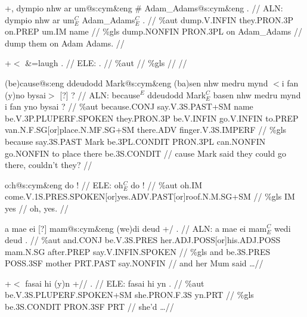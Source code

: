 \documentclass[a4paper,10pt]{article}
\begin{document}
\ex
\begingl[lingstyle=gergl]
\glchat +, dympio nhw ar um@s:cym\&eng \# Adam\_Adams@s:cym\&eng . //
\glsurface ALN:  dympio nhw ar um$^{C}_{E}$ Adam\_Adams$^{C}_{E}$ .  //
\glauto \%aut  dump{\scriptsize .V.INFIN} they{\scriptsize .PRON.3P} on{\scriptsize .PREP} um{\scriptsize .IM} name   //
\glmanual \%gls  dump{\scriptsize .NONFIN} PRON{\scriptsize .3PL} on Adam\_Adams    //
\gleng dump them on Adam Adams. //
\endgl
\xe

\ex
\begingl[lingstyle=gergl]
\glchat +$<$ \&=laugh . //
\glsurface ELE:  .  //
\glauto \%aut    //
\glmanual \%gls    //
\gleng  //
\endgl
\xe

\ex
\begingl[lingstyle=gergl]
\glchat (be)cause@s:eng ddeudodd Mark@s:cym\&eng (ba)sen nhw medru mynd $<$i fan (y)no bysai$>$ [?] ? //
\glsurface ALN:  because$^{E}$ ddeudodd Mark$^{C}_{E}$ basen nhw medru mynd i fan yno bysai ?  //
\glauto \%aut  because{\scriptsize .CONJ} say{\scriptsize .V.3S.PAST+SM} name be{\scriptsize .V.3P.PLUPERF.SPOKEN} they{\scriptsize .PRON.3P} be{\scriptsize .V.INFIN} go{\scriptsize .V.INFIN} to{\scriptsize .PREP} van{\scriptsize .N.F.SG[or]place.N.MF.SG+SM} there{\scriptsize .ADV} finger{\scriptsize .V.3S.IMPERF}   //
\glmanual \%gls  because say{\scriptsize .3S.PAST} Mark be{\scriptsize .3PL.CONDIT} PRON{\scriptsize .3PL} can{\scriptsize .NONFIN} go{\scriptsize .NONFIN} to place there be{\scriptsize .3S.CONDIT}   //
\gleng cause Mark said they could go there, couldn't they? //
\endgl
\xe

\ex
\begingl[lingstyle=gergl]
\glchat o:h@s:cym\&eng do ! //
\glsurface ELE:  oh$^{C}_{E}$ do !  //
\glauto \%aut  oh{\scriptsize .IM} come{\scriptsize .V.1S.PRES.SPOKEN[or]yes.ADV.PAST[or]roof.N.M.SG+SM}   //
\glmanual \%gls  IM yes   //
\gleng oh, yes. //
\endgl
\xe

\ex
\begingl[lingstyle=gergl]
\glchat a mae ei [?] mam@s:cym\&eng (we)di deud +/ . //
\glsurface ALN:  a mae ei mam$^{C}_{E}$ wedi deud .  //
\glauto \%aut  and{\scriptsize .CONJ} be{\scriptsize .V.3S.PRES} her{\scriptsize .ADJ.POSS[or]his.ADJ.POSS} mam{\scriptsize .N.SG} after{\scriptsize .PREP} say{\scriptsize .V.INFIN.SPOKEN}   //
\glmanual \%gls  and be{\scriptsize .3S.PRES} POSS{\scriptsize .3SF} mother PRT{\scriptsize .PAST} say{\scriptsize .NONFIN}   //
\gleng and her Mum said \dots  //
\endgl
\xe

\ex
\begingl[lingstyle=gergl]
\glchat +$<$ fasai hi (y)n +// . //
\glsurface ELE:  fasai hi yn .  //
\glauto \%aut  be{\scriptsize .V.3S.PLUPERF.SPOKEN+SM} she{\scriptsize .PRON.F.3S} yn{\scriptsize .PRT}   //
\glmanual \%gls  be{\scriptsize .3S.CONDIT} PRON{\scriptsize .3SF} PRT   //
\gleng she'd \dots  //
\endgl
\xe
\end{document}
